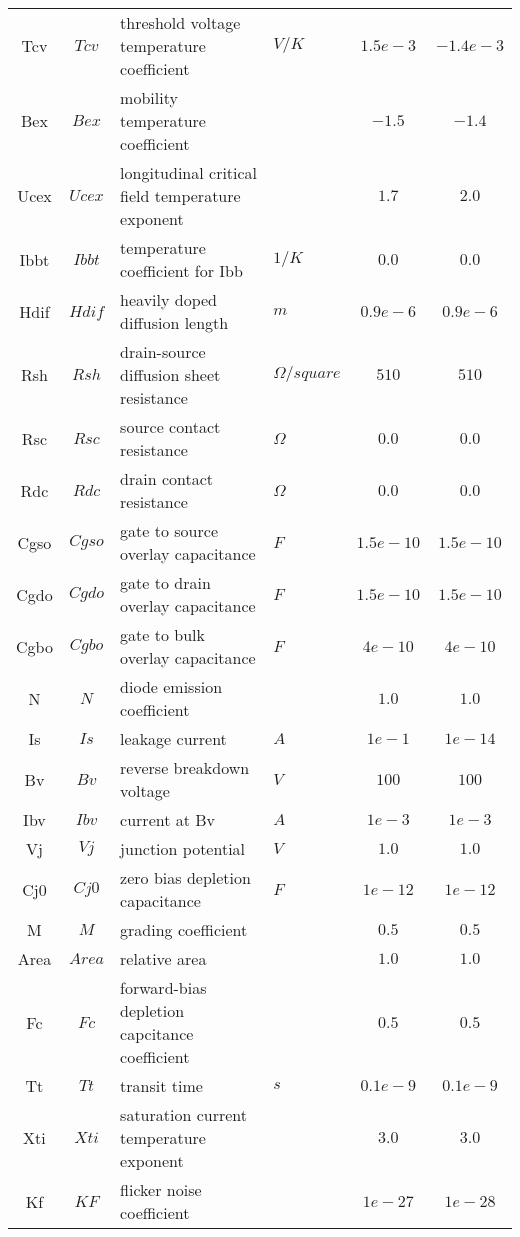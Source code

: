 \begin{scriptsize}
\begin{longtable}{ccllcc}
Tcv  & $Tcv$ & threshold voltage temperature coefficient  & $V/K$     & $1.5e-3$ & $-1.4e-3$ \\
Bex & $Bex$ & mobility temperature coefficient  &     & $-1.5$ & $-1.4$ \\
Ucex   & $Ucex$ & longitudinal critical field temperature exponent   & $ $    & $1.7$ & $2.0$ \\
Ibbt  & $Ibbt$ & temperature coefficient for Ibb  & $1/K$     & $0.0$ & $0.0$ \\
Hdif   & $Hdif$ & heavily doped diffusion length   & $m$    & $0.9e-6$ & $0.9e-6$ \\
Rsh & $Rsh$ & drain-source diffusion sheet resistance  &  $\Omega/square$  & $510$ & $510$ \\
Rsc  & $Rsc$ & source contact resistance  & $\Omega$     & $0.0$ & $0.0$ \\
Rdc  & $Rdc$ & drain contact resistance   & $\Omega$    & $0.0$ & $0.0$ \\
Cgso  & $Cgso$ & gate to source overlay capacitance  &  $F$  & $1.5e-10$ & $1.5e-10$ \\
Cgdo  & $Cgdo$ & gate to drain overlay capacitance  &  $F$  & $1.5e-10$ & $1.5e-10$ \\
Cgbo  & $Cgbo$ & gate to bulk overlay capacitance  &  $F$  & $4e-10$ & $4e-10$ \\
N  & $N$ & diode emission coefficient  &    & $1.0$ & $1.0$ \\
Is  & $Is$ & leakage current  & $A$   & $1e-1$ & $1e-14$ \\
Bv  & $Bv$ & reverse breakdown voltage  &  $V$  & $100$ & $100$ \\
Ibv & $Ibv$ & current at Bv  &  $A$   & $1e-3$ & $1e-3$ \\
Vj  & $Vj$ & junction potential  & $V$   & $1.0$ & $1.0$ \\
Cj0  & $Cj0$ & zero bias depletion capacitance  &  $F$  & $1e-12$ & $1e-12$ \\
M    & $M$ & grading coefficient  &     & $0.5$ & $0.5$ \\
Area & $Area$ & relative area  &    & $1.0$ & $1.0$ \\
Fc & $Fc$ & forward-bias depletion capcitance coefficient  &  & $0.5$ & $0.5$ \\
Tt  & $Tt$ & transit time  & $s$   & $0.1e-9$ & $0.1e-9$ \\
Xti  & $Xti$ & saturation current temperature exponent  &    & $3.0$ & $3.0$ \\
Kf   & $KF$  & flicker noise coefficient                &    & $1e-27$ & $1e-28$ \\

\end{longtable}
\end{scriptsize}
